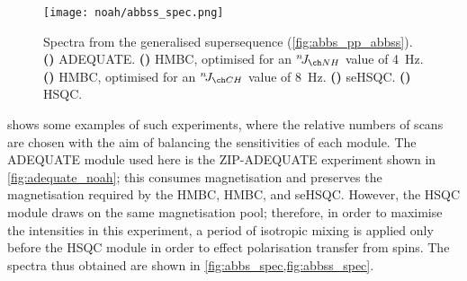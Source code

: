\begin{figure}[!ht]
    \centering
    \texttt{[image: noah/abbss\_spec.png]}%
    {\label{fig:abbss_spec_a}}%
    {\label{fig:abbss_spec_bn}}%
    {\label{fig:abbss_spec_b}}%
    {\label{fig:abbss_spec_s}}%
    {\label{fig:abbss_spec_sn}}%
    \caption[Spectra from  generalised supersequence]{
        Spectra from the  generalised supersequence (\cref{fig:abbs_pp_abbss}).
        \textbf{()} ADEQUATE.
        \textbf{()} \nitrogen{} HMBC, optimised for an $\nJ{NH}$ value of \qty{4}{\Hz}.
        \textbf{()} \carbon{} HMBC, optimised for an $\nJ{CH}$ value of \qty{8}{\Hz}.
        \textbf{()} \nitrogen{} seHSQC.
        \textbf{()} \carbon{} HSQC.
    }
    \label{fig:abbss_spec}
\end{figure}

 shows some examples of such experiments, where the relative numbers of scans are chosen with the aim of balancing the sensitivities of each module.
The ADEQUATE module used here is the ZIP-ADEQUATE experiment shown in \cref{fig:adequate_noah}; this consumes  magnetisation and preserves the  magnetisation required by the \nitrogen{} HMBC, \carbon{} HMBC, and \nitrogen{} seHSQC.
However, the \carbon{} HSQC module draws on the same magnetisation pool; therefore, in order to maximise the intensities in this experiment, a period of isotropic mixing is applied only before the HSQC module in order to effect polarisation transfer from  spins.
The spectra thus obtained are shown in \cref{fig:abbs_spec,fig:abbss_spec}.

